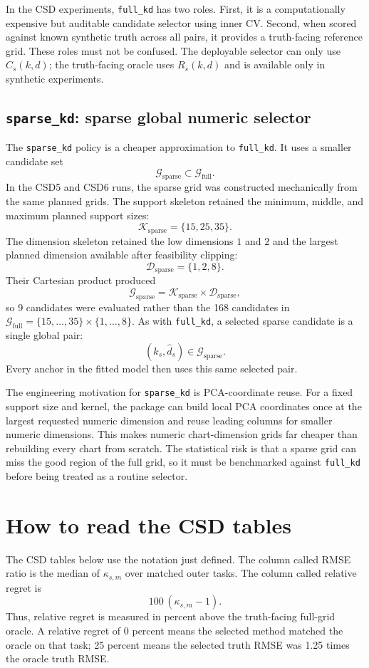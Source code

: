 \documentclass[11pt]{article}
\newcommand{\Gfull}{\mathcal G_{\mathrm{full}}}
\newcommand{\Gsparse}{\mathcal G_{\mathrm{sparse}}}
\newcommand{\code}[1]{\texttt{#1}}
\begin{document}
In the CSD experiments, \code{full\_kd} has two roles.  First, it is a
computationally expensive but auditable candidate selector using inner CV.
Second, when scored against known synthetic truth across all pairs, it provides a
truth-facing reference grid.  These roles must not be confused.  The deployable
selector can only use $C_s(k,d)$; the truth-facing oracle uses
$R_s(k,d)$ and is available only in synthetic experiments.

\subsection{\code{sparse\_kd}: sparse global numeric selector}

The \code{sparse\_kd} policy is a cheaper approximation to \code{full\_kd}.  It
uses a smaller candidate set
\[
  \Gsparse\subset\Gfull.
\]
In the CSD5 and CSD6 runs, the sparse grid was constructed mechanically from the
same planned grids.  The support skeleton retained the minimum, middle, and
maximum planned support sizes:
\[
  \mathcal K_{\mathrm{sparse}}=\{15,25,35\}.
\]
The dimension skeleton retained the low dimensions $1$ and $2$ and the largest
planned dimension available after feasibility clipping:
\[
  \mathcal D_{\mathrm{sparse}}=\{1,2,8\}.
\]
Their Cartesian product produced
\[
  \Gsparse
  =
  \mathcal K_{\mathrm{sparse}}\times \mathcal D_{\mathrm{sparse}},
\]
so 9 candidates were evaluated rather than the 168 candidates in
$\Gfull=\{15,\ldots,35\}\times\{1,\ldots,8\}$.  As with \code{full\_kd}, a
selected sparse candidate is a single global pair:
\[
  (\widehat k_s,\widehat d_s)\in\Gsparse.
\]
Every anchor in the fitted model then uses this same selected pair.

The engineering motivation for \code{sparse\_kd} is PCA-coordinate reuse.  For a
fixed support size and kernel, the package can build local PCA coordinates once
at the largest requested numeric dimension and reuse leading columns for smaller
numeric dimensions.  This makes numeric chart-dimension grids far cheaper than
rebuilding every chart from scratch.  The statistical risk is that a sparse grid
can miss the good region of the full grid, so it must be benchmarked against
\code{full\_kd} before being treated as a routine selector.

\section{How to read the CSD tables}

The CSD tables below use the notation just defined.  The column called RMSE
ratio is the median of $\kappa_{s,m}$ over matched outer tasks.  The column
called relative regret is
\[
  100\,(\kappa_{s,m}-1).
\]
Thus, relative regret is measured in percent above the truth-facing full-grid
oracle.  A relative regret of 0 percent means the selected method matched the
oracle on that task; 25 percent means the selected truth RMSE was 1.25 times the
oracle truth RMSE.
\end{document}
